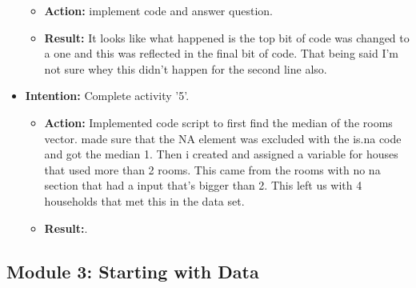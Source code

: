 \documentclass{article}
\begin{document}
\begin{itemize}
\begin{itemize}
\item{\textbf{Action:} implement code and answer question.}
\item{\textbf{Result:} It looks like what happened is the top bit of code was changed to a one and this was reflected in the final bit of code. That being said I'm not sure whey this didn't happen for the second line also.}
\end{itemize}

\item{\textbf{Intention:} Complete activity '5'.}

\begin{itemize}
\item{\textbf{Action:} Implemented code script to first find the median of the rooms vector. made sure that the NA element was excluded with the is.na code and got the median 1. Then i created and assigned a variable for houses that used more than 2 rooms. This came from the rooms with no na section that had a input that's bigger than 2. This left us with 4 households that met this in the data set.}
\item{\textbf{Result:}.}
\end{itemize}



\end{itemize}



\subsection{Module 3: Starting with Data}
\end{document}
